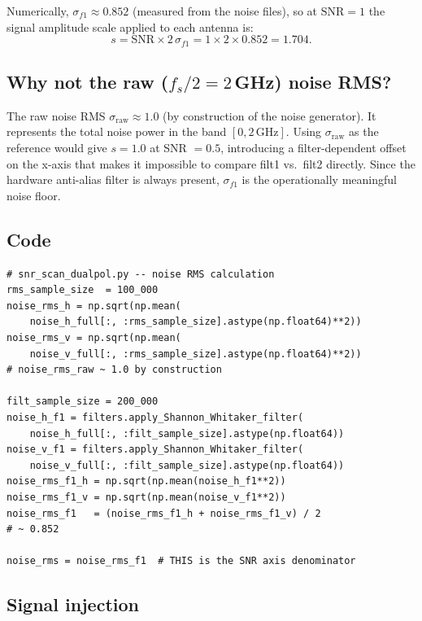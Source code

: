 \documentclass[11pt,letterpaper]{article}
\newenvironment{codebox}{%
  \begin{mdframed}[backgroundcolor=codebg,linewidth=0.5pt,innerleftmargin=6pt,innerrightmargin=6pt,innertopmargin=4pt,innerbottommargin=4pt]%
  \small}{\end{mdframed}}
\begin{document}
Numerically, $\sigma_{f1} \approx 0.852$ (measured from the noise files), so
at $\mathrm{SNR} = 1$ the signal amplitude scale applied to each antenna is:
\[
  s = \mathrm{SNR} \times 2\,\sigma_{f1} = 1 \times 2 \times 0.852 = 1.704.
\]

\subsection{Why not the raw ($f_s/2 = 2$\,GHz) noise RMS?}

The raw noise RMS $\sigma_\mathrm{raw} \approx 1.0$ (by construction of the
noise generator). It represents the total noise power in the band
$[0, 2\,\mathrm{GHz}]$.  Using $\sigma_\mathrm{raw}$ as the reference would
give $s = 1.0$ at SNR $= 0.5$, introducing a filter-dependent offset on the
x-axis that makes it impossible to compare filt1 vs.\ filt2 directly. Since
the hardware anti-alias filter is always present, $\sigma_{f1}$ is the
operationally meaningful noise floor.

\subsection{Code}

\begin{codebox}
\begin{Verbatim}
# snr_scan_dualpol.py -- noise RMS calculation
rms_sample_size  = 100_000
noise_rms_h = np.sqrt(np.mean(
    noise_h_full[:, :rms_sample_size].astype(np.float64)**2))
noise_rms_v = np.sqrt(np.mean(
    noise_v_full[:, :rms_sample_size].astype(np.float64)**2))
# noise_rms_raw ~ 1.0 by construction

filt_sample_size = 200_000
noise_h_f1 = filters.apply_Shannon_Whitaker_filter(
    noise_h_full[:, :filt_sample_size].astype(np.float64))
noise_v_f1 = filters.apply_Shannon_Whitaker_filter(
    noise_v_full[:, :filt_sample_size].astype(np.float64))
noise_rms_f1_h = np.sqrt(np.mean(noise_h_f1**2))
noise_rms_f1_v = np.sqrt(np.mean(noise_v_f1**2))
noise_rms_f1   = (noise_rms_f1_h + noise_rms_f1_v) / 2
# ~ 0.852

noise_rms = noise_rms_f1  # THIS is the SNR axis denominator
\end{Verbatim}
\end{codebox}

\subsection{Signal injection}
\label{sec:injection}
\end{document}
